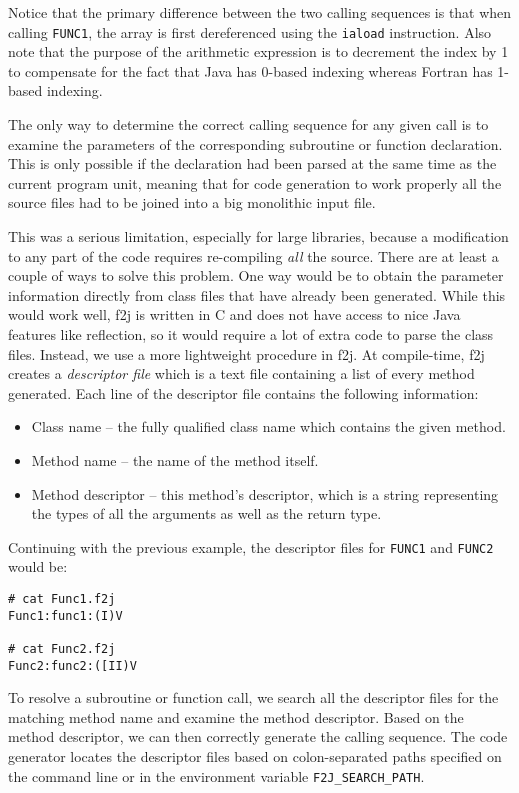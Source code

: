 \documentclass[11pt]{article}
\begin{document}
Notice that the primary difference between the two calling sequences
is that when calling {\tt FUNC1}, the array is first dereferenced using the {\tt iaload}
instruction.  Also note that the purpose of the arithmetic expression is
to decrement the index by 1 to compensate for the fact that
Java has 0-based indexing whereas Fortran has 1-based indexing.

The only way to determine the correct calling sequence for
any given call is to examine the
parameters of the corresponding subroutine or function declaration.
This is only possible if the declaration had been
parsed at the same time as the current program unit, meaning
that for code generation to work properly all the source files
had to be joined into a big monolithic input file.

This was a serious limitation, especially for large libraries,
because a modification to any part of the code requires
re-compiling {\em all} the source.
There are at least a couple of ways to solve this problem.
One way would be to obtain the parameter information directly
from class files that have already been generated.  While this
would work well, f2j is written in C
and does not have access to nice Java features like reflection,
so it would require a lot of extra code
to parse the class files.
Instead, we use a more lightweight
procedure in f2j.  At compile-time, f2j creates a {\it descriptor file} which
is a text file containing a list of every method generated.  Each
line of the descriptor file contains the following information:
\begin{itemize}
\item Class name -- the fully qualified class name which contains
the given method.
\item Method name -- the name of the method itself.
\item Method descriptor -- this method's descriptor, which is
a string representing the types of all the arguments as well
as the return type.
\end{itemize}
Continuing with the previous example, the descriptor files 
for {\tt FUNC1} and {\tt FUNC2} would be:
\begin{verbatim}
# cat Func1.f2j
Func1:func1:(I)V

# cat Func2.f2j
Func2:func2:([II)V
\end{verbatim}

To resolve a subroutine or function call, we search all
the descriptor files for the matching method name and examine
the method descriptor.  Based on the method descriptor, we can then
correctly generate the calling sequence.  
The code generator
locates the descriptor files based on colon-separated paths specified
on the command line or
in the environment variable {\tt F2J\_SEARCH\_PATH}.
\end{document}
